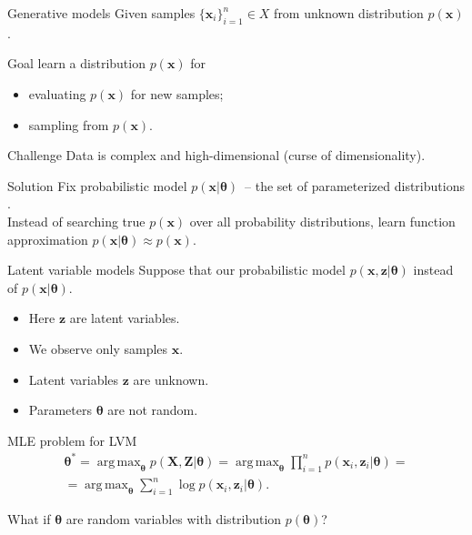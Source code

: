 \documentclass{beamer}
\newcommand{\bx}{\mathbf{x}}
\newcommand{\bz}{\mathbf{z}}
\newcommand{\bX}{\mathbf{X}}
\newcommand{\bZ}{\mathbf{Z}}
\newcommand{\btheta}{\boldsymbol{\theta}}
\DeclareMathOperator*{\argmax}{arg\,max}
\begin{document}
\begin{frame}{Generative models}
    Given samples $\{\bx_i\}_{i=1}^n \in X$ from unknown distribution $p(\bx)$.
    
    \begin{block}{Goal}
    	learn a distribution $p(\bx)$ for 
    	\begin{itemize}
    	    \item evaluating $p(\bx)$ for new samples;
    	    \item sampling from $p(\bx)$.
    	\end{itemize}
    \end{block}
    \begin{block}{Challenge}
    	 Data is complex and high-dimensional (curse of dimensionality).
    \end{block}
    \begin{block}{Solution}
        Fix probabilistic model $p(\bx | \btheta)$~-- the set of parameterized distributions . \\
        Instead of searching true $p(\bx)$ over all probability distributions, learn function approximation $p(\bx | \btheta) \approx p(\bx)$.
    \end{block}
\end{frame}
\begin{frame}{Latent variable models}
    Suppose that our probabilistic model $p(\bx, \bz | \btheta)$ instead of $p(\bx | \btheta)$.
    \begin{itemize}
        \item Here $\bz$ are latent variables.
        \item We observe only samples $\bx$. 
        \item Latent variables $\bz$ are unknown.
        \item Parameters $\btheta$ are not random.
    \end{itemize}
    \begin{block}{MLE problem for LVM}
    \vspace{-0.3cm}
    \begin{multline*}
        \btheta^* = \argmax_{\btheta} p(\bX, \bZ | \btheta) = \argmax_{\btheta} \prod_{i=1}^n p(\bx_i, \bz_i | \btheta) = \\ = \argmax_{\btheta} \sum_{i=1}^n \log p(\bx_i, \bz_i | \btheta).
    \end{multline*}
    \vspace{-0.1cm}
    \end{block}
    What if $\btheta$ are random variables with distribution $p(\btheta)$?
\end{frame}
\end{document}
